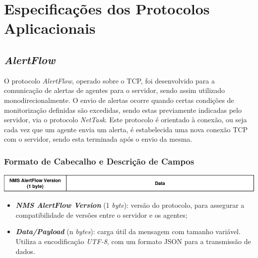 \documentclass[a4paper,12pt]{scrreprt}
\begin{document}



\chapter{Especificações dos Protocolos Aplicacionais}

\section{\textit{AlertFlow}}

O protocolo \textit{AlertFlow}, operado sobre o TCP, foi desenvolvido para a
comunicação de alertas de
agentes para o servidor, sendo assim utilizado monodirecionalmente. O envio de
alertas ocorre quando certas condições de monitorização definidas são excedidas,
sendo estas previamente indicadas pelo servidor, via o protocolo \textit{NetTask}.
Este protocolo é orientado à conexão, ou seja cada vez que um agente envia um alerta,
é estabelecida uma nova conexão TCP com o servidor, sendo esta terminada após o envio
da mesma.

\subsection{Formato de Cabecalho e Descrição de Campos}

\begin{minipage}{\textwidth}
    \centering
    \includegraphics[width=\textwidth]{img/alertflow_header.png}
    \label{fig:alertflow_message_format}
\end{minipage}

\begin{itemize}
    \item \textbf{\textit{NMS AlertFlow Version}} (1 \textit{byte}): versão do protocolo,
        para assegurar a compatibilidade de versões entre o servidor e os agentes;
    \item \textbf{\textit{Data/Payload}} (n \textit{bytes}): carga útil da mensagem com
        tamanho variável. Utiliza a encodificação \textit{UTF-8}, com um formato JSON
        para a transmissão de dados.
\end{itemize}
\end{document}
